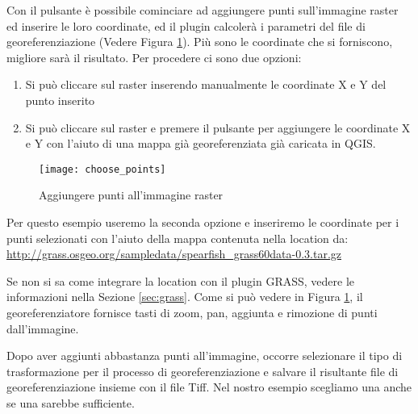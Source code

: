 Con il pulsante  è possibile cominciare ad aggiungere punti sull'immagine raster ed inserire le loro coordinate, ed il plugin calcolerà i parametri del file di georeferenziazione (Vedere Figura \ref{fig:choose_points}).
Più sono le coordinate che si forniscono, migliore sarà il risultato. Per procedere ci sono due opzioni:

\begin{enumerate}
\item Si può cliccare sul raster inserendo manualmente le coordinate X e Y del punto inserito
\item Si può cliccare sul raster e premere il pulsante  per aggiungere le coordinate X e Y con l'aiuto di una mappa già georeferenziata già caricata in QGIS.
\end{enumerate}

\begin{figure}[ht]
\begin{center}
  \caption{Aggiungere punti all'immagine raster \nixcaption}\label{fig:choose_points}\smallskip
  \texttt{[image: choose\_points]}
\end{center}
\end{figure}

Per questo esempio useremo la seconda opzione e inseriremo le coordinate per i punti selezionati con l'aiuto della mappa  contenuta nella location  da: \url{http://grass.osgeo.org/sampledata/spearfish\_grass60data-0.3.tar.gz}

Se non si sa come integrare la location  con il plugin GRASS, vedere le informazioni nella Sezione \ref{sec:grass}. Come si può vedere in Figura \ref{fig:choose_points}, il georeferenziatore fornisce tasti di zoom, pan, aggiunta e rimozione di punti dall'immagine.

Dopo aver aggiunti abbastanza punti all'immagine, occorre selezionare il tipo di trasformazione per il processo di georeferenziazione e salvare il risultante file di georeferenziazione insieme con il file Tiff.
Nel nostro esempio scegliamo una
anche se una
sarebbe sufficiente.


\begin{Tip}\caption{\textsc{Scegliere il tipo di trasformazione}}
\end{Tip} 

